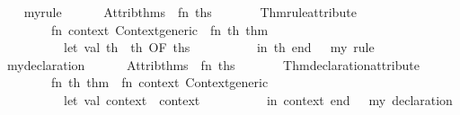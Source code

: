 \begin{isabellebody}
\begin{isamarkuptext}
\begin{description}
  \end{description}%
\end{isamarkuptext}%
\isamarkuptrue%
%
\isadelimML
\ \ %
\endisadelimML
%
\isatagML
{}\isamarkupfalse%
\ my{}rule\ {}\ {}\isanewline
\ \ \ \ Attrib{}thms\ {}{}\ {}fn\ ths\ {}{}\isanewline
\ \ \ \ \ \ Thm{}rule{}attribute\isanewline
\ \ \ \ \ \ \ \ {}fn\ context{}\ Context{}generic\ {}{}\ fn\ th{}\ thm\ {}{}\isanewline
\ \ \ \ \ \ \ \ \ \ let\ val\ th{}\ {}\ th\ OF\ ths\isanewline
\ \ \ \ \ \ \ \ \ \ in\ th{}\ end{}{}\ {}\ \ {}my\ rule{}\isanewline
\isanewline
\ \ \isamarkupfalse%
\ my{}declaration\ {}\ {}\isanewline
\ \ \ \ Attrib{}thms\ {}{}\ {}fn\ ths\ {}{}\isanewline
\ \ \ \ \ \ Thm{}declaration{}attribute\isanewline
\ \ \ \ \ \ \ \ {}fn\ th{}\ thm\ {}{}\ fn\ context{}\ Context{}generic\ {}{}\isanewline
\ \ \ \ \ \ \ \ \ \ let\ val\ context{}\ {}\ context\isanewline
\ \ \ \ \ \ \ \ \ \ in\ context{}\ end{}{}\ {}\ \ {}my\ declaration{}%

\end{isabellebody}

